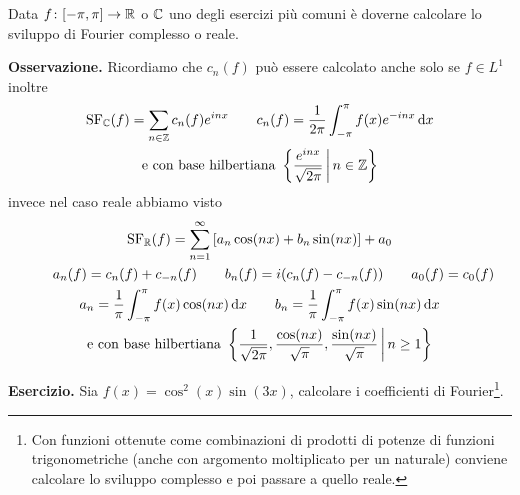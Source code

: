 %
%



Data $f \colon [-\pi, \pi] \to \mathbb R$ o $\mathbb C$ uno degli esercizi più comuni è doverne calcolare lo sviluppo di Fourier complesso o reale.

\textbf{Osservazione.}
Ricordiamo che $c_n(f)$ può essere calcolato anche solo se $f \in L^1$ inoltre
$$
\begin{gathered}
	\operatorname{SF}_\mathbb C(f) = \sum_{n \in \mathbb Z} c_n(f) e^{inx}
	\qquad
	c_n(f) = \frac{1}{2\pi} \int_{-\pi}^\pi f(x) e^{-inx} \,\mathrm{d} x \\
	\text{e con base hilbertiana } \left\{ \frac{e^{inx}}{\sqrt{2\pi}} \,\middle|\, n \in \mathbb Z \right\}
\end{gathered}
$$
invece nel caso reale abbiamo visto
$$
\begin{gathered}
	\operatorname{SF}_\mathbb R(f) = \sum_{n=1}^\infty \left[ a_n \cos(nx) + b_n \sin(nx) \right] + a_0 \\
	\qquad
	a_n(f) = c_n(f) + c_{-n}(f)
	\qquad
	b_n(f) = i(c_n(f) - c_{-n}(f))
	\qquad
	a_0(f) = c_0(f) \\
	a_n = \frac{1}{\pi} \int_{-\pi}^\pi f(x) \cos(nx) \,\mathrm{d} x
	\qquad
	b_n = \frac{1}{\pi} \int_{-\pi}^\pi f(x) \sin(nx) \,\mathrm{d} x \\
	\text{e con base hilbertiana } \left\{ \frac{1}{\sqrt{2\pi}}, \frac{\cos(nx)}{\sqrt{\pi}}, \frac{\sin(nx)}{\sqrt{\pi}} \,\middle|\, n \geq 1 \right\}
\end{gathered}
$$

\textbf{Esercizio.}
Sia $f(x) = \cos^2(x) \sin(3x)$, calcolare i coefficienti di Fourier\footnote{Con funzioni ottenute come combinazioni di prodotti di potenze di funzioni trigonometriche (anche con argomento moltiplicato per un naturale) conviene calcolare lo sviluppo complesso e poi passare a quello reale.}.

